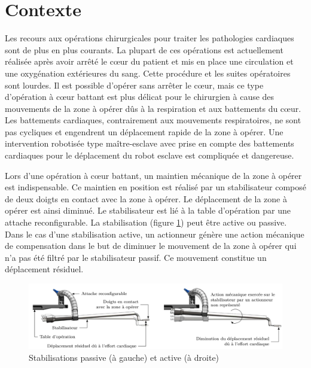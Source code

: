 

\section{Contexte}

Les recours aux opérations chirurgicales pour traiter les pathologies cardiaques sont de plus en plus courants. La plupart de ces opérations est actuellement réalisée après avoir arrêté le c\oe ur du patient et mis en place une circulation et une oxygénation extérieures du sang. Cette procédure et les suites opératoires sont lourdes.
Il est possible d'opérer sans arrêter le c\oe ur, mais ce type d'opération à c\oe ur battant est plus délicat pour le chirurgien à cause des mouvements de la zone à opérer dûs à la respiration et aux battements du c\oe ur. Les battements cardiaques, contrairement aux mouvements respiratoires, ne sont pas cycliques et engendrent un déplacement rapide de la zone à opérer. Une intervention robotisée type maître-esclave avec prise en compte des battements cardiaques pour le déplacement du robot esclave est compliquée et dangereuse.

Lors d'une opération à c\oe ur battant, un maintien mécanique de la zone à opérer est indispensable. Ce maintien en position est réalisé par un stabilisateur composé de deux doigts en contact avec la zone à opérer. Le déplacement de la zone à opérer est ainsi diminué. Le stabilisateur est lié à la table d'opération par une attache reconfigurable. La stabilisation (figure \ref{fig01}) peut être active ou passive. Dans le cas d'une stabilisation active, un actionneur génère une action mécanique de compensation dans le but de diminuer le mouvement de la zone à opérer qui n'a pas été filtré par le stabilisateur passif. Ce mouvement constitue un déplacement résiduel.

\begin{figure}[ht]
\begin{center}
\includegraphics[width=0.9\linewidth]{img/fig01}
\caption{Stabilisations passive (à gauche) et active (à droite)}
\label{fig01}
\end{center}
\end{figure} 

